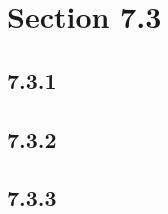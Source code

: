 





\section*{Section 7.3}

\subsection*{7.3.1}
\begin{enumerate}
\end{enumerate}

\subsection*{7.3.2}
\begin{enumerate}
\end{enumerate}

\subsection*{7.3.3}
\begin{enumerate}
\end{enumerate}

